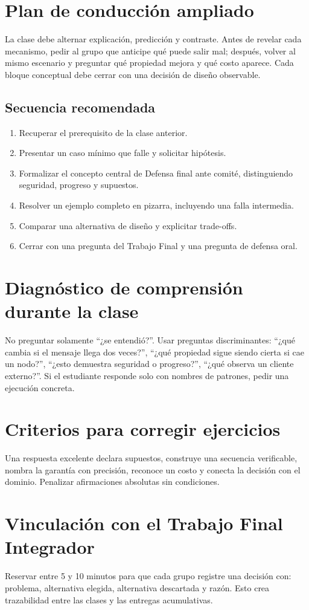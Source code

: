 \documentclass[variant=docente,cover=institutional,mode=screen]{ua-engineering-v6-article}
\begin{document}
\section{Plan de conducción ampliado}
La clase debe alternar explicación, predicción y contraste. Antes de revelar cada mecanismo, pedir al grupo que anticipe qué puede salir mal; después, volver al mismo escenario y preguntar qué propiedad mejora y qué costo aparece. Cada bloque conceptual debe cerrar con una decisión de diseño observable.
\subsection*{Secuencia recomendada}
\begin{enumerate}
\item Recuperar el prerequisito de la clase anterior.
\item Presentar un caso mínimo que falle y solicitar hipótesis.
\item Formalizar el concepto central de Defensa final ante comité, distinguiendo seguridad, progreso y supuestos.
\item Resolver un ejemplo completo en pizarra, incluyendo una falla intermedia.
\item Comparar una alternativa de diseño y explicitar trade-offs.
\item Cerrar con una pregunta del Trabajo Final y una pregunta de defensa oral.
\end{enumerate}
\section{Diagnóstico de comprensión durante la clase}
No preguntar solamente ``¿se entendió?''. Usar preguntas discriminantes: ``¿qué cambia si el mensaje llega dos veces?'', ``¿qué propiedad sigue siendo cierta si cae un nodo?'', ``¿esto demuestra seguridad o progreso?'', ``¿qué observa un cliente externo?''. Si el estudiante responde solo con nombres de patrones, pedir una ejecución concreta.
\section{Criterios para corregir ejercicios}
Una respuesta excelente declara supuestos, construye una secuencia verificable, nombra la garantía con precisión, reconoce un costo y conecta la decisión con el dominio. Penalizar afirmaciones absolutas sin condiciones.
\section{Vinculación con el Trabajo Final Integrador}
Reservar entre 5 y 10 minutos para que cada grupo registre una decisión con: problema, alternativa elegida, alternativa descartada y razón. Esto crea trazabilidad entre las clases y las entregas acumulativas.
\end{document}
